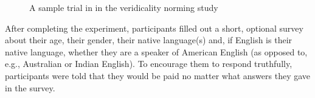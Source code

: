\documentclass[11pt,fleqn]{article}
\newcommand{\6}{\mbox{$[\hspace*{-.6mm}[$}}
\newcommand{\9}{\mbox{$]\hspace*{-.6mm}]$}}
\begin{document}
\begin{figure}[h!]
\begin{center}
\end{center}
\caption{A sample trial in in the veridicality norming study}\label{f-trial-exp2}
\end{figure}

After completing the experiment, participants filled out a short, optional survey about their age, their gender, their native language(s) and, if English is their native language, whether they are a speaker of American English (as opposed to, e.g., Australian or Indian English). To encourage them to respond truthfully, participants were told that they would be paid no matter what answers they gave in the survey.
\end{document}
